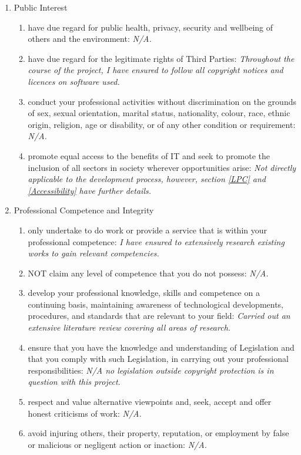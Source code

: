 \begin{enumerate}
    \item Public Interest
    \begin{enumerate}
        \item have due regard for public health, privacy, security and wellbeing of others and the environment: \textit{N/A.}
        \item have due regard for the legitimate rights of Third Parties: \textit{Throughout the course of the project, I have ensured to follow all copyright notices and licences on software used.}
        \item conduct your professional activities without discrimination on the grounds of sex, sexual orientation, marital status, nationality, colour, race, ethnic origin, religion, age or disability, or of any other condition or requirement: \textit{N/A.}
        \item promote equal access to the benefits of IT and seek to promote the inclusion of all sectors in society wherever opportunities arise: \textit{Not directly applicable to the development process, however, section \ref{LPC} and \ref{Accessibility} have further details.}
  \end{enumerate}
  \newpage
  \item Professional Competence and Integrity
  \begin{enumerate}
      \item only undertake to do work or provide a service that is within your professional competence: \textit{I have ensured to extensively research existing works to gain relevant competencies.}
      \item NOT claim any level of competence that you do not possess: \textit{N/A.}
      \item develop your professional knowledge, skills and competence on a continuing basis, maintaining awareness of technological developments, procedures, and standards that are relevant to your field: \textit{Carried out an extensive literature review covering all areas of research.}
      \item ensure that you have the knowledge and understanding of Legislation and that you comply with such Legislation, in carrying out your professional responsibilities: \textit{N/A no legislation outside copyright protection is in question with this project.}
      \item respect and value alternative viewpoints and, seek, accept and offer honest criticisms of work: \textit{N/A.}
      \item avoid injuring others, their property, reputation, or employment by false or malicious or negligent action or inaction: \textit{N/A.}

\end{enumerate}
\end{enumerate}
